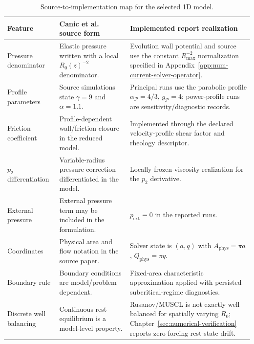 \begin{table}[!htb]
    \centering
    \scriptsize
    \caption{Source-to-implementation map for the selected 1D model.}
    \label{tab:source-to-implementation-model}
    \begin{tabularx}{\textwidth}{@{}
        >{\raggedright\arraybackslash}p{}
        >{\raggedright\arraybackslash}p{}
        >{\raggedright\arraybackslash}X@{}}
        \toprule
        \textbf{Feature} & \textbf{Canic et al. source form} & \textbf{Implemented report realization} \\
        \midrule
        Pressure denominator
            & Elastic pressure written with a local $R_0(z)^{-2}$ denominator.
            & Evolution wall potential and source use the constant
            $R_{\max}^{-2}$ normalization specified in
            Appendix~\ref{app:num-current-solver-operator}. \\
        Profile parameters
            & Source simulations state $\gamma=9$ and $\alpha=1.1$.
            & Principal runs use the parabolic profile
            $\alpha_{\mathcal P}=4/3$, $g_{\mathcal P}=4$; power-profile runs
            are sensitivity/diagnostic records. \\
        Friction coefficient
            & Profile-dependent wall/friction closure in the reduced model.
            & Implemented through the declared velocity-profile shear factor
            and rheology descriptor. \\
        $p_2$ differentiation
            & Variable-radius pressure correction differentiated in the model.
            & Locally frozen-viscosity realization for the $p_2$ derivative. \\
        External pressure
            & External pressure term may be included in the formulation.
            & $p_{\mathrm{ext}}\equiv0$ in the reported runs. \\
        Coordinates
            & Physical area and flow notation in the source paper.
            & Solver state is $(a,q)$ with
            $A_{\mathrm{phys}}=\pi a$, $Q_{\mathrm{phys}}=\pi q$. \\
        Boundary rule
            & Boundary conditions are model/problem dependent.
            & Fixed-area characteristic approximation applied with persisted
            subcritical-regime diagnostics. \\
        Discrete well balancing
            & Continuous rest equilibrium is a model-level property.
            & Rusanov/MUSCL is not exactly well balanced for spatially varying
            $R_0$; Chapter~\ref{sec:numerical-verification} reports
            zero-forcing rest-state drift. \\
        \bottomrule
    \end{tabularx}
\end{table}

